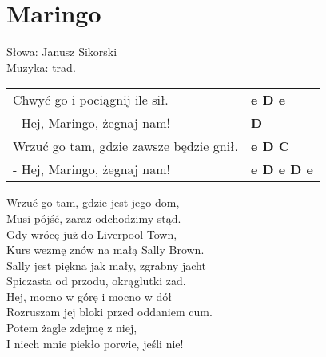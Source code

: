 \section{Maringo}

Słowa: Janusz Sikorski\\
Muzyka: trad.

\vspace{2em}
\begin{tabular}{@{}p{7cm}@{}l@{}}
Chwyć go i pociągnij ile sił. & \bfseries e D e\\
- Hej, Maringo, żegnaj nam! & \bfseries D\\
Wrzuć go tam, gdzie zawsze będzie gnił. & \bfseries e D C\\
- Hej, Maringo, żegnaj nam! & \bfseries e D e D e\\
\end{tabular}

\vspace{1em}
Wrzuć go tam, gdzie jest jego dom, \\
Musi pójść, zaraz odchodzimy stąd. \\

Gdy wrócę już do Liverpool Town, \\
Kurs wezmę znów na małą Sally Brown. \\

Sally jest piękna jak mały, zgrabny jacht \\
Spiczasta od przodu, okrąglutki zad. \\

Hej, mocno w górę i mocno w dół \\
Rozruszam jej bloki przed oddaniem cum. \\

Potem żagle zdejmę z niej, \\
I niech mnie piekło porwie, jeśli nie!